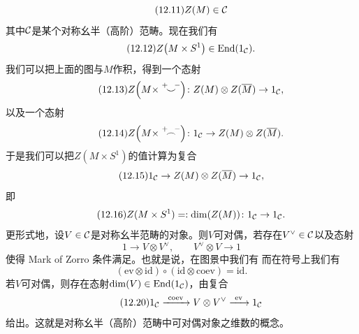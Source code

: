 \begin{equation}\tag{12.11}
Z(M)\in\mathcal{C}
\end{equation}
其中$\mathcal{C}$是某个对称幺半（高阶）范畴。现在我们有
\begin{equation}\tag{12.12}
Z\bigl(M\times S^{1}\bigr)\in\mathrm{End}(1_{\mathcal{C}}).
\end{equation}
我们可以把上面的图与$M$作积，得到一个态射
\begin{equation}\tag{12.13}
Z\Bigl(M\times\overset{+\ \ -}{\smile}\Bigr)\colon Z(M)\otimes Z(\overline{M})\to 1_{\mathcal{C}},
\end{equation}
以及一个态射
\begin{equation}\tag{12.14}
Z\Bigl(M\times\overset{+\ \ -}{\frown}\Bigr)\colon 1_{\mathcal{C}}\to Z(M)\otimes Z(\overline{M}).
\end{equation}
于是我们可以把$Z(M\times S^{1})$的值计算为复合
\begin{equation}\tag{12.15}
1_{\mathcal{C}}\to Z(M)\otimes Z(\overline{M})\to 1_{\mathcal{C}},
\end{equation}
即
\begin{equation}\tag{12.16}
Z(M\times S^{1})=:\dim(Z(M))\colon 1_{\mathcal{C}}\to 1_{\mathcal{C}}.
\end{equation}
更形式地，设$V\in\mathcal{C}$是对称幺半范畴的对象。则$V$可对偶，若存在$V^{\vee}\in\mathcal{C}$以及态射
\begin{equation}\tag{12.17}
1\to V\otimes V^{\vee},\qquad V^{\vee}\otimes V\to 1
\end{equation}
使得 Mark of Zorro 条件满足。也就是说，在图景中我们有
而在符号上我们有
\begin{equation}\tag{12.19}
(\mathrm{ev}\otimes\mathrm{id})\circ(\mathrm{id}\otimes\mathrm{coev})=\mathrm{id}.
\end{equation}
若$V$可对偶，则存在态射$\dim(V)\in\mathrm{End}(1_{\mathcal{C}})$，由复合
\begin{equation}\tag{12.20}
1_{\cC}\xrightarrow{\ \mathrm{coev}\ }V\otimes V^{\vee}\xrightarrow{\ \mathrm{ev}\ }1_{\cC}
\end{equation}
给出。这就是对称幺半（高阶）范畴中可对偶对象之维数的概念。

